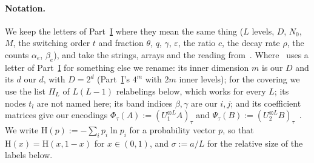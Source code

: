 \documentclass[11pt]{article}
\theoremstyle{definition}
\theoremstyle{remark}
\newcommand{\Hh}{\mathrm{H}}
\newcommand{\Nz}{N_0}
\begin{document}
\paragraph{Notation.} We keep the letters of Part~\hyperref[m:partI]{I} where they mean the same thing ($L$ levels, $D$, $\Nz$, $M$, the switching order $t$ and fraction $\theta$, $q$, $\gamma$, $\varepsilon$, the ratio $c$, the decay rate $\rho$, the counts $\alpha_e$, $\beta_e$), and take the strings, arrays and the reading from~\cite{Maj26b}. Where~\cite{Maj26b} uses a letter of Part~\hyperref[m:partI]{I} for something else we rename: its inner dimension $m$ is our $D$ and its $d$ our $d$, with $D=2^d$ (Part~\hyperref[m:partI]{I}'s $4^m$ with $2m$ inner levels); for the covering we use the list $\Pi_L$ of $L(L-1)$ relabelings below, which works for every $L$; its nodes $t_l$ are not named here; its band indices $\beta,\gamma$ are our $i,j$; and its coefficient matrices give our encodings $\Phi_\tau(A):=(U_1^{\otimes L}A)_\tau$ and $\Psi_\tau(B):=(U_2^{\otimes L}B)_\tau$~\cite[Lemma~2.3]{Maj26b}. We write $\Hh(p):=-\sum_ip_i\ln p_i$ for a probability vector $p$, so that $\Hh(x)=\Hh(x,1-x)$ for $x\in(0,1)$, and $\sigma:=a/L$ for the relative size of the labels below.
\end{document}
